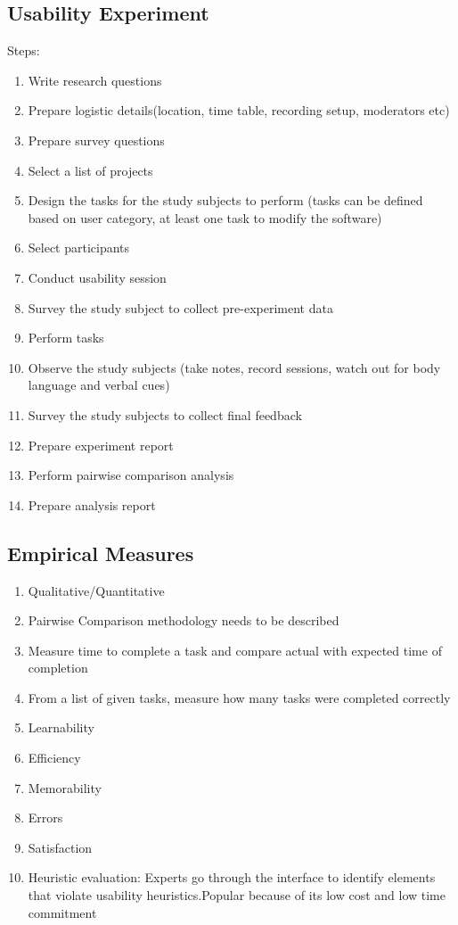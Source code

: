\documentclass[letterpaper,cleveref]{lipics-v2019}
\theoremstyle{definition}
\begin{document}
\subsection{Usability Experiment}
Steps:
\begin {enumerate}
\item Write research questions
\item Prepare logistic details(location, time table, recording setup, moderators etc)
\item Prepare survey questions
\item Select a list of projects
\item Design the tasks for the study subjects to perform (tasks can be defined based on user category, at least one task to modify the software)
\item Select participants
\item Conduct usability session
\item Survey the study subject to collect pre-experiment data
\item Perform tasks
\item Observe the study subjects (take notes, record sessions, watch out for body language and verbal cues)
\item Survey the study subjects to collect final feedback
\item Prepare experiment report
\item Perform pairwise comparison analysis
\item Prepare analysis report
\end {enumerate}

\subsection{Empirical Measures}
 \begin {enumerate}
 \item Qualitative/Quantitative
 \item Pairwise Comparison methodology needs to be described
 \item Measure time to complete a task and compare actual with expected time of completion
 \item From a list of given tasks, measure how many tasks were completed correctly
 \item Learnability
 \item Efficiency
 \item Memorability
 \item Errors
 \item Satisfaction
 \item Heuristic evaluation: Experts go through the interface to identify elements that violate usability heuristics.Popular because of its low cost and low time commitment
\end {enumerate}
\end{document}
